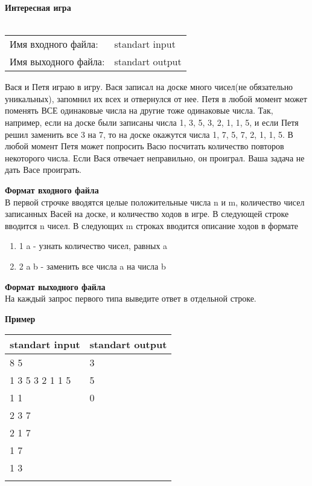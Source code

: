 \documentclass[10pt, a4paper]{article}
\begin{document}
	{\selectfont
		\noindent\LARGE\textbf{Интересная игра}\\\\
		\normalsize
		\begin{tabular}{ll}
			\indent Имя входного файла: & standart input\\
			\indent Имя выходного файла: & standart output\\
		\end{tabular}
		
		\noindent Вася и Петя играю в игру. Вася записал на доске много чисел(не обязательно уникальных), запомнил их всех и отвернулся от нее. Петя в любой момент может поменять ВСЕ одинаковые числа на другие тоже одинаковые числа. Так, например, если на доске были записаны числа 1, 3, 5, 3, 2, 1, 1, 5, и если Петя решил заменить все 3 на 7, то на доске окажутся числа 1, 7, 5, 7, 2, 1, 1, 5. В любой момент Петя может попросить Васю посчитать количество повторов некоторого числа. Если Вася отвечает неправильно, он проиграл. Ваша задача не дать Васе проиграть.
		
		\noindent\large\textbf{Формат входного файла}\\
		\normalsize В первой строчке вводятся целые положительные числа n и m, количество чисел записанных Васей на доске, и количество ходов в игре. В следующей строке вводится n чисел. В следующих m строках вводится описание ходов в формате 
		\begin{enumerate}
				\item 1 a - узнать количество чисел, равных a
				\item 2 a b - заменить все числа a на числа b
		\end{enumerate}
		
		\noindent\large\textbf{Формат выходного файла}\\\normalsize На каждый запрос первого типа выведите ответ в отдельной строке. 
		
		\noindent\large\textbf{Пример}\normalsize
		
		\noindent\begin{tabular}{|p{5,5cm}|p{}|}
			\hline
			\multicolumn{1}{|c|}{standart input} & \multicolumn{1}{c|}{standart output}\\\hline
			8 5 & 3 \\
			1 3 5 3 2 1 1 5 & 5 \\
			1 1 & 0\\
			2 3 7 & \\
			2 1 7 & \\
			1 7 & \\
			1 3 & \\
			& \\\hline
		\end{tabular}
		
	}
	
\end{document}
